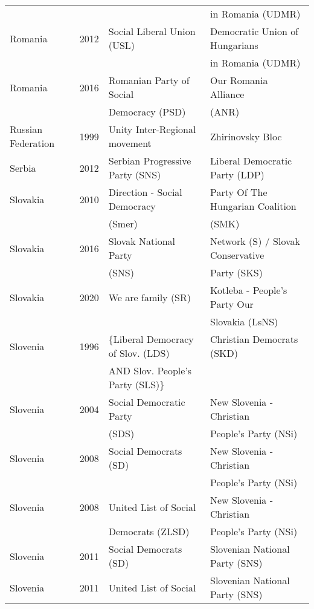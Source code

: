 {\begin{longtable}{|l|c|l|l|}
               &      &         &    in Romania (UDMR) \\ 
   Romania & 2012 &   Social Liberal Union (USL)   &   Democratic Union of Hungarians \\ 
               &      &         &   in Romania (UDMR)   \\ 
   Romania & 2016 &   Romanian Party of Social   &   Our Romania Alliance  \\ 
               &      &      Democracy (PSD)    &   (ANR)  \\ 
   Russian Federation & 1999 &   Unity Inter-Regional movement &   Zhirinovsky Bloc \\ 
   Serbia & 2012 &   Serbian Progressive Party (SNS)   &   Liberal Democratic Party (LDP)   \\ 
   Slovakia & 2010 &   Direction - Social Democracy &   Party Of The Hungarian Coalition  \\ 
               &      &      (Smer)    &    (SMK) \\ 
   Slovakia & 2016 &   Slovak National Party &   Network (S) / Slovak Conservative   \\ 
               &      &      (SNS)    &    Party (SKS)  \\ 
   Slovakia & 2020 &   We are family (SR) &   Kotleba - People's Party Our    \\ 
               &      &         &  Slovakia (LsNS)   \\ 
   Slovenia & 1996 & $\lbrace$Liberal Democracy of Slov. (LDS)  &   Christian Democrats (SKD)   \\ 
    &   & AND Slov. People's Party (SLS)$\rbrace$&   \\ 
   Slovenia & 2004 &        Social Democratic Party &   New Slovenia - Christian    \\ 
               &      &      (SDS)    &    People's Party (NSi) \\ 
   Slovenia & 2008 &   Social Democrats (SD)  &   New Slovenia - Christian   \\ 
               &      &         &   People's Party (NSi)   \\ 
   Slovenia & 2008 &   United List of Social  &   New Slovenia - Christian   \\ 
               &      &     Democrats (ZLSD)    &   People's Party (NSi)   \\ 
   Slovenia & 2011 &   Social Democrats (SD)  &   Slovenian National Party (SNS) \\ 
   Slovenia & 2011 &   United List of Social  &   Slovenian National Party (SNS) \\ 

\end{longtable}}
